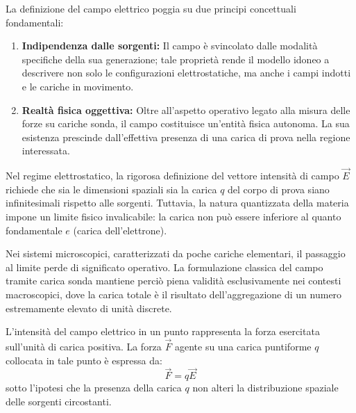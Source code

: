 \documentclass[11pt,a4paper]{article}
\begin{document}

La definizione del campo elettrico poggia su due principi concettuali fondamentali:
\begin{enumerate}
	\item \textbf{Indipendenza dalle sorgenti:} Il campo è svincolato dalle modalità specifiche della sua generazione; tale proprietà rende il modello idoneo a descrivere non solo le configurazioni elettrostatiche, ma anche i campi indotti e le cariche in movimento.
	\item \textbf{Realtà fisica oggettiva:} Oltre all'aspetto operativo legato alla misura delle forze su cariche sonda, il campo costituisce un'entità fisica autonoma. La sua esistenza prescinde dall'effettiva presenza di una carica di prova nella regione interessata.
\end{enumerate}

Nel regime elettrostatico, la rigorosa definizione del vettore intensità di campo $\vec{E}$ richiede che sia le dimensioni spaziali sia la carica $q$ del corpo di prova siano infinitesimali rispetto alle sorgenti. Tuttavia, la natura quantizzata della materia impone un limite fisico invalicabile: la carica non può essere inferiore al quanto fondamentale $e$ (carica dell'elettrone).

Nei sistemi microscopici, caratterizzati da poche cariche elementari, il passaggio al limite perde di significato operativo. La formulazione classica del campo tramite carica sonda mantiene perciò piena validità esclusivamente nei contesti macroscopici, dove la carica totale è il risultato dell'aggregazione di un numero estremamente elevato di unità discrete.

L'intensità del campo elettrico in un punto rappresenta la forza esercitata sull'unità di carica positiva. La forza $\vec{F}$ agente su una carica puntiforme $q$ collocata in tale punto è espressa da:
\begin{equation}
	\vec{F} = q\vec{E}
\end{equation}
sotto l'ipotesi che la presenza della carica $q$ non alteri la distribuzione spaziale delle sorgenti circostanti.
\end{document}

